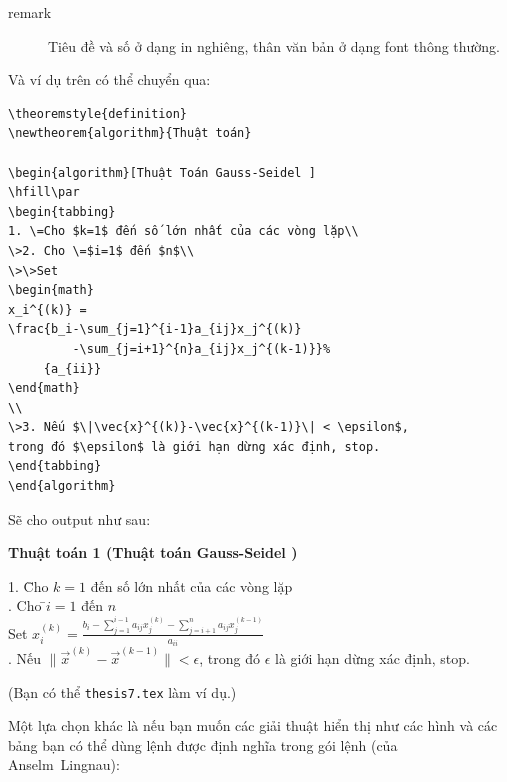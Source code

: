 \documentclass[a4paper]{report}
\begin{document}
\begin{enumerate}
\begin{description}
\item[remark] Tiêu đề và số ở dạng in nghiêng, thân văn bản ở dạng font thông thường.
\end{description}

Và ví dụ trên có thể chuyển qua:
\begin{code}
\begin{verbatim}
\theoremstyle{definition}
\newtheorem{algorithm}{Thuật toán}

\begin{algorithm}[Thuật Toán Gauss-Seidel ]
\hfill\par
\begin{tabbing}
1. \=Cho $k=1$ đến số lớn nhất của các vòng lặp\\
\>2. Cho \=$i=1$ đến $n$\\
\>\>Set 
\begin{math}
x_i^{(k)} = 
\frac{b_i-\sum_{j=1}^{i-1}a_{ij}x_j^{(k)}
         -\sum_{j=i+1}^{n}a_{ij}x_j^{(k-1)}}%
     {a_{ii}}
\end{math}
\\
\>3. Nếu $\|\vec{x}^{(k)}-\vec{x}^{(k-1)}\| < \epsilon$, 
trong đó $\epsilon$ là giới hạn dừng xác định, stop.
\end{tabbing}
\end{algorithm}
\end{verbatim}
\end{code}%
Sẽ cho output như sau:
\begin{result}
\textbf{Thuật toán 1 (Thuật toán Gauss-Seidel )}
\begin{tabbing}
1. \=Cho $k=1$ đến số lớn nhất của các vòng lặp\\
. Cho \=$i=1$ đến $n$\\
\>\>Set 
\begin{math}
x_i^{(k)} = 
\frac{b_i-\sum_{j=1}^{i-1}a_{ij}x_j^{(k)}-\sum_{j=i+1}^{n}a_{ij}x_j^{(k-1)}}{a_{ii}}
\end{math}
\\
. Nếu $\|\vec{x}^{(k)}-\vec{x}^{(k-1)}\| < \epsilon$, 
trong đó $\epsilon$ là giới hạn dừng xác định, stop.
\end{tabbing}
\end{result}

\end{enumerate}
(Bạn có thể   \texttt{thesis7.tex} làm ví dụ.)

Một lựa chọn khác là nếu bạn muốn các giải thuật hiển thị như các hình và các bảng bạn có thể dùng lệnh  được định nghĩa trong gói lệnh  (của Anselm~Lingnau):
\end{document}
